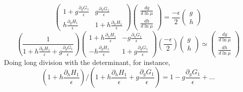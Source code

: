 \documentclass[twoside]{amsart}
\begin{document}
\begin{itemize}
\[
\left( \begin{matrix} 1 + g \frac{ \partial_g G_1}{\epsilon} & g \frac{ \partial_h G_1}{\epsilon} \\ h \frac{ \partial_g H_1}{ \epsilon } & 1 + h \frac{ \partial_h H_1}{ \epsilon } \end{matrix} \right) \left( \begin{matrix} \frac{dg}{d\ln{\mu}} \\ \frac{dh}{d\ln{\mu}} \end{matrix} \right) = \frac{-\epsilon}{2} \left( \begin{matrix} g \\ h \end{matrix} \right)
\]
\[
\left( \frac{1}{ 1 + h \frac{ \partial_h H_1}{\epsilon} + g \frac{ \partial_g G_1}{\epsilon } } \right) \left( \begin{matrix} 1 + h \frac{ \partial_h H_1}{\epsilon } & - g \frac{ \partial_h G_1}{\epsilon } \\ - h \frac{\partial_g H_1}{\epsilon } & 1 + g \frac{ \partial_g G_1}{ \epsilon } \end{matrix} \right) \left( \frac{ -\epsilon}{2} \right) \left( \begin{matrix} g \\ h \end{matrix} \right) \simeq \left( \begin{matrix} \frac{dg}{d\ln{ \mu} } \\ \frac{dh}{ d\ln{ \mu}} \end{matrix} \right)
\]
Doing long division with the determinant, for instance,
\[
\left( 1 + h \frac{ \partial_h H_1}{\epsilon} \right)/ \left( 1 + h \frac{ \partial_h H_1}{ \epsilon } + g \frac{ \partial_g G_1}{ \epsilon} \right) = 1 - g \frac{ \partial_g G_1}{\epsilon} + \dots
\]


\end{itemize}
\end{document}
